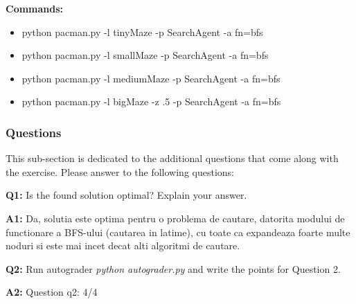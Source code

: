 \begin{itemize}
\begin{itemize}
\end{itemize}


\textbf{Commands:}
\begin{itemize}
    \setlength\itemsep{0em}
    \item python pacman.py -l tinyMaze -p SearchAgent -a fn=bfs
    \item python pacman.py -l smallMaze -p SearchAgent -a fn=bfs
    \item python pacman.py -l mediumMaze -p SearchAgent -a
    fn=bfs
    \item python pacman.py -l bigMaze -z .5 -p SearchAgent -a fn=bfs %
        
\end{itemize}

\subsubsection{Questions}
This sub-section is dedicated to the additional questions that come along with the exercise. Please answer to the following questions:\newline


\textbf{Q1:} Is the found solution optimal? Explain your answer. 


\textbf{A1:} Da, solutia este optima pentru o problema de cautare, datorita modului de functionare a BFS-ului (cautarea in latime), cu toate ca expandeaza foarte multe noduri si este mai incet decat alti algoritmi de cautare. %


\textbf{Q2:} Run autograder \textit{python autograder.py} and write the points for Question 2.


\textbf{A2:} Question q2: 4/4 %



\end{itemize}

